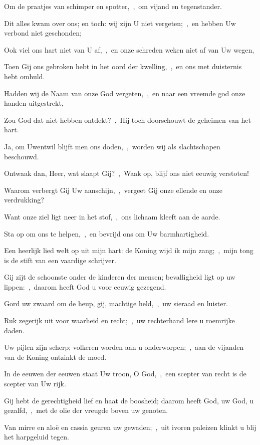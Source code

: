 \documentclass[12pt,twoside,a5paper]{article}
\begin{document}
\begin{halfparskip}
  Om de praatjes van schimper en spotter,~\sep\ om vijand en tegenstander.

  Dit alles kwam over ons; en toch: wij zijn U niet vergeten;~\sep\ en hebben Uw verbond niet geschonden;

  Ook viel ons hart niet van U af,~\sep\ en onze schreden weken niet af van Uw wegen,

  Toen Gij ons gebroken hebt in het oord der kwelling,~\sep\ en ons met duisternis hebt omhuld.

  Hadden wij de Naam van onze God vergeten,~\sep\ en naar een vreemde god onze handen uitgestrekt,

  Zou God dat niet hebben ontdekt?~\sep\ Hij toch doorschouwt de geheimen van het hart.

  Ja, om Uwentwil blijft men ons doden,~\sep\ worden wij als slachtschapen beschouwd.

  Ontwaak dan, Heer, wat slaapt Gij?~\sep\ Waak op, blijf ons niet eeuwig verstoten!

  Waarom verbergt Gij Uw aanschijn,~\sep\ vergeet Gij onze ellende en onze verdrukking?

  Want onze ziel ligt neer in het stof,~\sep\ ons lichaam kleeft aan de aarde.

  Sta op om ons te helpen,~\sep\ en bevrijd ons om Uw barmhartigheid.

   Een heerlijk lied welt op uit mijn hart: de Koning wijd ik mijn zang;~\sep\ mijn tong is de stift van een vaardige schrijver.

  Gij zijt de schoonste onder de kinderen der mensen; bevalligheid ligt op uw lippen:~\sep\ daarom heeft God u voor eeuwig gezegend.

  Gord uw zwaard om de heup, gij, machtige held,~\sep\ uw sieraad en luister.

  Ruk zegerijk uit voor waarheid en recht;~\sep\ uw rechterhand lere u roemrijke daden.

  Uw pijlen zijn scherp; volkeren worden aan u onderworpen;~\sep\ aan de vijanden van de Koning ontzinkt de moed.

  In de eeuwen der eeuwen staat Uw troon, O God,~\sep\ een scepter van recht is de scepter van Uw rijk.

  Gij hebt de gerechtigheid lief en haat de boosheid; daarom heeft God, uw God, u gezalfd,~\sep\ met de olie der vreugde boven uw genoten.

  Van mirre en aloë en cassia geuren uw gewaden;~\sep\ uit ivoren paleizen klinkt u blij het harpgeluid tegen.


\end{halfparskip}
\end{document}
